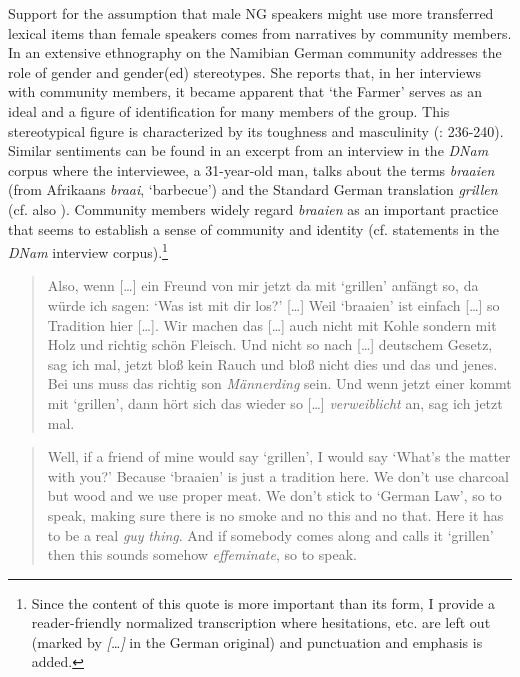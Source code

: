 \documentclass[output=paper]{langsci/langscibook}
\begin{document}
Support for the assumption that male NG speakers might use more transferred lexical items than female speakers comes from narratives by community members. In an extensive ethnography on the Namibian German community \citet{schmidt-lauber_verkehrte_1998} addresses the role of gender and gender(ed) stereotypes. She reports that, in her interviews with community members, it became apparent that ‘the Farmer’ serves as an ideal and a figure of identification for many members of the group. This stereotypical figure is characterized by its toughness and masculinity (\citealt{schmidt-lauber_verkehrte_1998}: 236-240). Similar sentiments can be found in an excerpt from an interview in the \textit{DNam} corpus where the interviewee, a 31-year-old man, talks about the terms \textit{braaien} (from Afrikaans \textit{braai}, ‘barbecue’) and the Standard German translation \textit{grillen} (cf. also \citealt{zimmer_linguisticvar_toappear}). Community members widely regard \textit{braaien} as an important practice that seems to establish a sense of community and identity (cf. statements in the \textit{DNam} interview corpus).\footnote{Since the content of this quote is more important than its form, I provide a reader-friendly normalized transcription where hesitations, etc. are left out (marked by \textit{[…]} in the German original) and punctuation and emphasis is added.}

\begin{quotation}
Also, wenn […] ein Freund von mir jetzt da mit ‘grillen’ anfängt so, da würde ich sagen: ‘Was ist mit dir los?’ […] Weil ‘braaien’ ist einfach […] so Tradition hier […]. Wir machen das […] auch nicht mit Kohle sondern mit Holz und richtig schön Fleisch. Und nicht so nach […] deutschem Gesetz, sag ich mal, jetzt bloß kein Rauch und bloß nicht dies und das und jenes. Bei uns muss das richtig son \textit{Männerding} sein. Und wenn jetzt einer kommt mit ‘grillen’, dann hört sich das wieder so […] \textit{verweiblicht} an, sag ich jetzt mal.\end{quotation}
\begin{quotation}
Well, if a friend of mine would say ‘grillen’, I would say ‘What’s the matter with you?’ Because ‘braaien’ is just a tradition here. We don’t use charcoal but wood and we use proper meat. We don’t stick to ‘German Law’, so to speak, making sure there is no smoke and no this and no that. Here it has to be a real \textit{guy} \textit{thing}. And if somebody comes along and calls it ‘grillen’ then this sounds somehow \textit{effeminate}, so to speak.\end{quotation}
\end{document}

